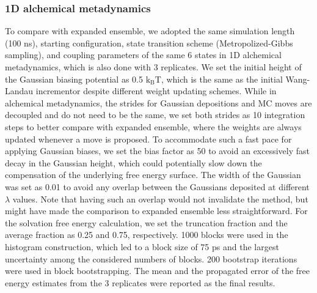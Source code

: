 \documentclass[journal=jacsat,manuscript=article]{achemso}
\begin{document}
\subsubsection{1D alchemical metadynamics}
To compare with expanded ensemble, we adopted the same simulation length (100 ns), starting configuration, state transition scheme (Metropolized-Gibbs sampling), and coupling parameters of the same 6 states in 1D alchemical metadynamics, which is also done with 3 replicates. We set the initial height of the Gaussian biasing potential as 0.5 $\text{k}_{\text{B}}\text{T}$, which is the same as the initial Wang-Landau incrementor despite different weight updating schemes. While in alchemical metadynamics, the strides for Gaussian depositions and MC moves are decoupled and do not need to be the same, we set both strides as 10 integration steps to better compare with expanded ensemble, where the weights are always updated whenever a move is proposed. To accommodate such a fast pace for applying Gaussian biases, we set the bias factor as 50 to avoid an excessively fast decay in the Gaussian height, which could potentially slow down the compensation of the underlying free energy surface. The width of the Gaussian was set as 0.01 to avoid any overlap between the Gaussians deposited at different $\lambda$ values. Note that having such an overlap would not invalidate the method, but might have made the comparison to expanded ensemble less straightforward. For the solvation free energy calculation, we set the truncation fraction and the average fraction as 0.25 and 0.75, respectively. 1000 blocks were used in the histogram construction, which led to a block size of 75 ps and the largest uncertainty among the considered numbers of blocks. 200 bootstrap iterations were used in block bootstrapping. The mean and the propagated error of the free energy estimates from the 3 replicates were reported as the final results.
\end{document}
